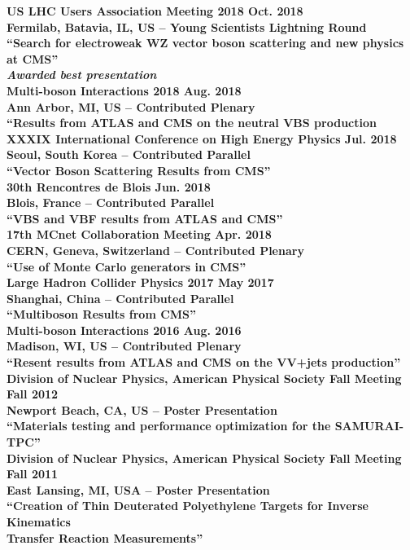\documentclass[10pt]{res} %
\begin{document}
\begin{resume}
\begin{tabbing}
\bf{US LHC Users Association Meeting 2018} 		 \> \>	    Oct. 2018 \\
Fermilab, Batavia, IL, US -- Young Scientists Lightning Round \\
``Search for electroweak WZ vector boson scattering and new physics at CMS'' \\
\emph{Awarded best presentation } \\
\bf{Multi-boson Interactions 2018} 		 \> \>	    Aug. 2018 \\
Ann Arbor, MI, US -- Contributed Plenary \\
``Results from ATLAS and CMS on the neutral VBS production \\
\bf{XXXIX International Conference on High Energy Physics} 		 \> \>	    Jul. 2018 \\
Seoul, South Korea -- Contributed Parallel\\
``Vector Boson Scattering Results from CMS'' \\
\bf{30th Rencontres de Blois} 		 \> \>	    Jun. 2018 \\
Blois, France -- Contributed Parallel\\
``VBS and VBF results from ATLAS and CMS'' \\
\bf{17th MCnet Collaboration Meeting} 		 \> \>	    Apr. 2018 \\
CERN, Geneva, Switzerland -- Contributed Plenary\\
``Use of Monte Carlo generators in CMS'' \\
\bf{Large Hadron Collider Physics 2017} 		 \> \>	    May 2017 \\
Shanghai, China -- Contributed Parallel \\
``Multiboson Results from CMS'' \\
\bf{Multi-boson Interactions 2016} 		 \> \>	    Aug. 2016 \\
Madison, WI, US -- Contributed Plenary \\
``Resent results from ATLAS and CMS on the VV+jets production'' \\
\bf{Division of Nuclear Physics, American Physical Society Fall Meeting} 		 \> \>	    Fall 2012 \\
Newport Beach, CA, US -- Poster Presentation\\
``Materials testing and performance optimization for the SAMURAI-TPC'' \\
\bf{Division of Nuclear Physics, American Physical Society Fall Meeting} 		 \> \>	    Fall 2011 \\
East Lansing, MI, USA -- Poster Presentation\\ 
``Creation of Thin Deuterated Polyethylene Targets for Inverse Kinematics \\Transfer Reaction Measurements'' \\
\end{tabbing}\vspace{-20pt}      %


\end{resume}
\end{document}
